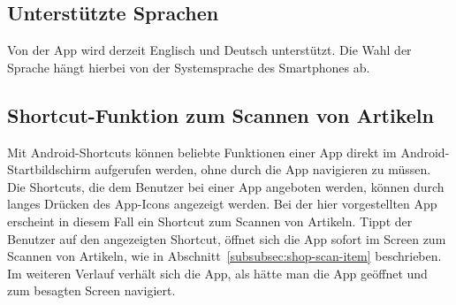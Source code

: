 \subsection{Unterstützte Sprachen} \label{subsec:languages}

Von der App wird derzeit Englisch und Deutsch unterstützt.
Die Wahl der Sprache hängt hierbei von der Systemsprache des Smartphones ab.

\subsection{Shortcut-Funktion zum Scannen von Artikeln} \label{subsec:scan-item-shortcut}

Mit Android-Shortcuts können beliebte Funktionen einer App direkt im Android-Startbildschirm aufgerufen werden, ohne durch die App navigieren zu müssen.
Die Shortcuts, die dem Benutzer bei einer App angeboten werden, können durch langes Drücken des App-Icons angezeigt werden.
Bei der hier vorgestellten App erscheint in diesem Fall ein Shortcut zum Scannen von Artikeln.
Tippt der Benutzer auf den angezeigten Shortcut, öffnet sich die App sofort im Screen zum Scannen von Artikeln, wie in Abschnitt~\ref{subsubsec:shop-scan-item} beschrieben.
Im weiteren Verlauf verhält sich die App, als hätte man die App geöffnet und zum besagten Screen navigiert.
